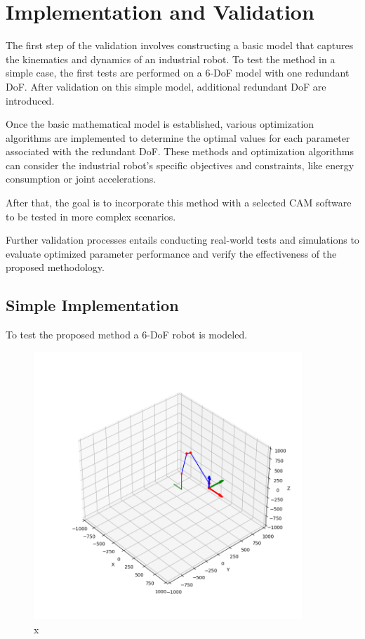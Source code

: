 \chapter{Implementation and Validation}%

The first step of the validation involves constructing a basic model that captures the kinematics and dynamics of an industrial robot. To test the method in a simple case, the first tests are performed on a 6-DoF model with one redundant DoF. After validation on this simple model, additional redundant DoF are introduced. 

Once the basic mathematical model is established, various optimization algorithms are implemented to determine the optimal values for each parameter associated with the redundant DoF. These methods and optimization algorithms can consider the industrial robot's specific objectives and constraints, like energy consumption or joint accelerations. 

After that, the goal is to incorporate this method with a selected CAM software to be tested in more complex scenarios.

Further validation processes entails conducting real-world tests and simulations to evaluate optimized parameter performance and verify the effectiveness of the proposed methodology.
\section{Simple Implementation}%
To test the proposed method a 6-DoF robot is modeled. 

 \begin{figure}[H]
	\centerline{\includegraphics[width=0.9\textwidth]{figures/robotprog.png}}
	\caption{x}
	\label{robotprog}
\end{figure}

